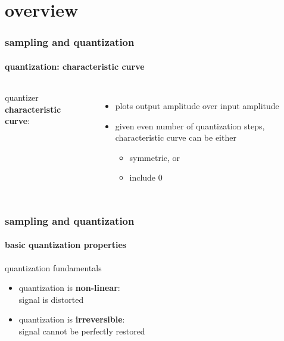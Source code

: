 \section{overview}
	\begin{frame}\frametitle{sampling and quantization}\framesubtitle{quantization: characteristic curve}
        \begin{columns}
                quantizer \textbf{characteristic curve}:
                \begin{itemize}
                    \item plots output amplitude over input amplitude
                    \smallskip
                    \item   given even number of quantization steps, characteristic curve can be either
                        \begin{itemize}
                            \item   symmetric, or
                            \item   include $0$
                        \end{itemize}
                \end{itemize}
        \end{columns}
    \end{frame}
	\begin{frame}\frametitle{sampling and quantization}\framesubtitle{basic quantization properties}
        \begin{block}{quantization fundamentals}
        \begin{itemize}
            \item   quantization is \textbf{non-linear}:\\ signal is distorted
            \smallskip
            \item   quantization is \textbf{irreversible}:\\ signal cannot be perfectly restored
        \end{itemize}
        \end{block}
	\end{frame}
	

